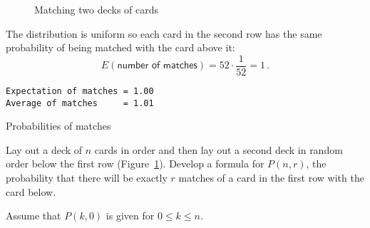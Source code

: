 \begin{figure}[tb]
\begin{center}
\end{center}
\caption{Matching two decks of cards}\label{f.cards}
\end{figure}

\solution{}

The distribution is uniform so each card in the second row has the same probability of being matched with the card above it:
\[
E(\textsf{number of matches}) = 52\cdot \frac{1}{52} = 1\,.
\]

\newpage

\sml{}

\begin{verbatim}
Expectation of matches = 1.00
Average of matches     = 1.01
\end{verbatim}


\begin{prob}{Probabilities of matches}

Lay out a deck of $n$ cards in order and then lay out a second deck in random order below the first row (Figure~\ref{f.cards}). Develop a formula for $P(n,r)$, the probability that there will be exactly $r$ matches of a card in the first row with the card below.

Assume that $P(k,0)$ is given for $0\leq k\leq n$.
\end{prob}

